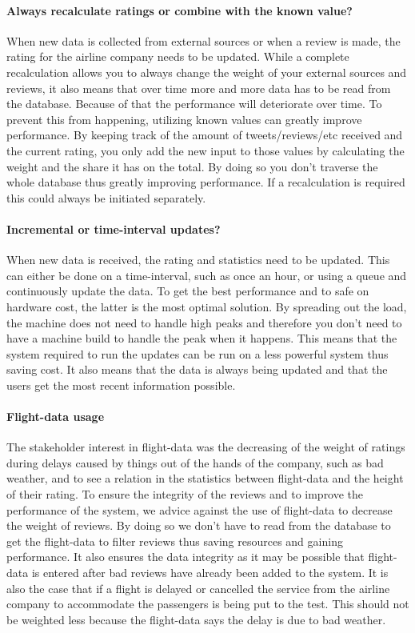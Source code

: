 \paragraph{Always recalculate ratings or combine with the known value?}
When new data is collected from external sources or when a review is made, the rating for the airline company needs to be updated. While a complete recalculation allows you to always change the weight of your external sources and reviews, it also means that over time more and more data has to be read from the database. Because of that the performance will deteriorate over time.
To prevent this from happening, utilizing known values can greatly improve performance. By keeping track of the amount of tweets/reviews/etc received and the current rating, you only add the new input to those values by calculating the weight and the share it has on the total. By doing so you don't traverse the whole database thus greatly improving performance. If a recalculation is required this could always be initiated separately.

\paragraph{Incremental or time-interval updates?}
When new data is received, the rating and statistics need to be updated. This can either be done on a time-interval, such as once an hour, or using a queue and continuously update the data. To get the best performance and to safe on hardware cost, the latter is the most optimal solution. By spreading out the load, the machine does not need to handle high peaks and therefore you don't need to have a machine build to handle the peak when it happens. This means that the system required to run the updates can be run on a less powerful system thus saving cost. It also means that the data is always being updated and that the users get the most recent information possible.

\paragraph{Flight-data usage}
The stakeholder interest in flight-data was the decreasing of the weight of ratings during delays caused by things out of the hands of the company, such as bad weather, and to see a relation in the statistics between flight-data and the height of their rating. To ensure the integrity of the reviews and to improve the performance of the system, we advice against the use of flight-data to decrease the weight of reviews. By doing so we don't have to read from the database to get the flight-data to filter reviews thus saving resources and gaining performance. It also ensures the data integrity as it may be possible that flight-data is entered after bad reviews have already been added to the system. It is also the case that if a flight is delayed or cancelled the service from the airline company to accommodate the passengers is being put to the test. This should not be weighted less because the flight-data says the delay is due to bad weather.